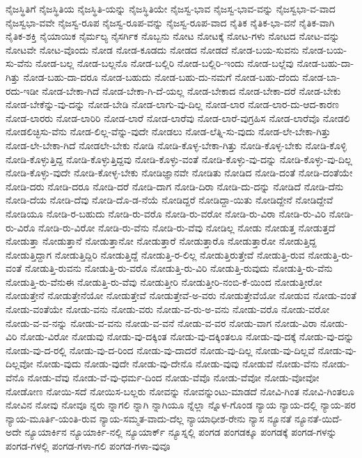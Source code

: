 {ನೈಜಸ್ಥಿತಿಗೆ
ನೈಜಸ್ಥಿತಿಯ
ನೈಜಸ್ಥಿತಿ-ಯನ್ನು
ನೈಜಸ್ಥಿತಿಯೇ
ನೈಜಸ್ವ-ಭಾವ
ನೈಜಸ್ವ-ಭಾವ-ವನ್ನು
ನೈಜಸ್ವಭಾ-ವ-ವಾದ
ನೈಜಸ್ವಭಾ-ವವೇ
ನೈಜಸ್ವ-ರೂಪ
ನೈಜಸ್ವ-ರೂಪ-ವನ್ನು
ನೈಜಸ್ವ-ರೂಪ-ವಾದ
ನೈತಿಕ
ನೈತಿಕ-ಭಾ-ವನೆ
ನೈತಿಕ-ವಾಗಿ
ನೈತಿಕ-ಶಕ್ತಿ
ನೈಯಾಯಿಕ
ನೈರ್ಮಲ್ಯ
ನೈಸರ್ಗಿಕ
ನೊಬ್ಬನು
ನೋಟ
ನೋಟಕ್ಕೆ
ನೋಟ-ಗಳು
ನೋಟದ
ನೋಟ-ವನ್ನು
ನೋಟವೇ
ನೋಟ-ವೊಂದು
ನೋಡ
ನೋಡ-ಕೂಡದು
ನೋಡದ
ನೋಡದೆ
ನೋಡ-ಬಯ-ಸುವನು
ನೋಡ-ಬಯ-ಸು-ವೆನು
ನೋಡ-ಬಲ್ಲ
ನೋಡ-ಬಲ್ಲನೊ
ನೋಡ-ಬಲ್ಲಿರಿ
ನೋಡ-ಬಲ್ಲಿರಿ-ಇಂದು
ನೋಡ-ಬಲ್ಲೆವು
ನೋಡ-ಬಹು-ದಾ-ಗಿತ್ತು
ನೋಡ-ಬಹು-ದಾ-ದರೂ
ನೋಡ-ಬಹುದು
ನೋಡ-ಬಹು-ದು-ನಮಗೆ
ನೋಡ-ಬಹು-ದೆಂದು
ನೋಡ-ಬಾ-ರದು-ಇಡೀ
ನೋಡ-ಬೇಕಾ-ಗಿದೆ
ನೋಡ-ಬೇಕಾ-ಗಿ-ದೆ-ಯಲ್ಲ
ನೋಡ-ಬೇಕಾದ
ನೋಡ-ಬೇಕಾ-ದರೆ
ನೋಡ-ಬೇಕು
ನೋಡ-ಬೇಕೆನ್ನು-ವು-ದನ್ನು
ನೋಡ-ಬೇಡಿ
ನೋಡ-ಲಾಗು-ವು-ದಿಲ್ಲ
ನೋಡ-ಲಾರ
ನೋಡ-ಲಾರ-ದು-ಆದ-ಕಾರಣ
ನೋಡ-ಲಾರರು
ನೋಡ-ಲಾರಿರಿ
ನೋಡ-ಲಾರೆ
ನೋಡ-ಲಾರೆವು
ನೋಡ-ಲಾರೆ-ವುಗ್ರಹಿಸ
ನೋಡ-ಲಾರೆವೊ
ನೋಡಲಿ
ನೋಡಲಿಚ್ಛಿಸು-ವೆನು
ನೋಡ-ಲಿಲ್ಲ-ವೆನ್ನು-ವುದೇ
ನೋಡಲು
ನೋಡ-ಲೆತ್ನಿ-ಸು-ವುದು
ನೋಡ-ಲೇ-ಬೇಕಾ-ಗಿತ್ತು
ನೋಡ-ಲೇ-ಬೇಕಾ-ಗಿದೆ
ನೋಡಲೇ-ಬೇಕು
ನೋಡಿ
ನೋಡಿ-ಕೊಳ್ಳ-ಬೇಕಾ-ಗಿತ್ತು
ನೋಡಿ-ಕೊಳ್ಳ-ಬೇಕು
ನೋಡಿ-ಕೊಳ್ಳಿ
ನೋಡಿ-ಕೊಳ್ಳುತ್ತಿದ್ದ
ನೋಡಿ-ಕೊಳ್ಳುತ್ತಿದ್ದವು
ನೋಡಿ-ಕೊಳ್ಳು-ವಂತೆ
ನೋಡಿ-ಕೊಳ್ಳು-ವು-ದನ್ನು
ನೋಡಿ-ಕೊಳ್ಳು-ವು-ದಿಲ್ಲ
ನೋಡಿ-ಕೊಳ್ಳು-ವುದೇ
ನೋಡಿ-ಕೋಳ್ಳ-ಬೇಕು
ನೋಡಿಜ್ಞಾನವೇ
ನೋಡಿತು
ನೋಡಿದ
ನೋಡಿ-ದಂತೆ
ನೋಡಿ-ದಂತೆಯೇ
ನೋಡಿ-ದರು
ನೋಡಿ-ದರೂ
ನೋಡಿ-ದರೆ
ನೋಡಿ-ದಾಗ
ನೋಡಿ-ದಿರಾ
ನೋಡಿ-ದು-ದನ್ನು
ನೋಡಿದೆ
ನೋಡಿ-ದೆನು
ನೋಡಿ-ದೆಯ
ನೋಡಿ-ದೆವು
ನೋಡಿ-ದೊ-ಡ-ನೆಯೆ
ನೋಡಿದ್ದರೆ
ನೋಡಿದ್ದಾ-ಯಿತು
ನೋಡಿದ್ದೇನೆ
ನೋಡಿದ್ದೇವೆ
ನೋಡಿಯೂ
ನೋಡಿ-ರ-ಬಹುದು
ನೋಡಿ-ರು-ವರೊ
ನೋಡಿ-ರು-ವರೋ
ನೋಡಿ-ರು-ವಿರಾ
ನೋಡಿ-ರು-ವಿರಿ
ನೋಡಿ-ರು-ವಿರೊ
ನೋಡಿ-ರು-ವಿರೋ
ನೋಡಿ-ರು-ವೆನು
ನೋಡಿ-ರು-ವೆವು
ನೋಡಿಲ್ಲ
ನೋಡು
ನೋಡುತ್ತ
ನೋಡುತ್ತದೆ
ನೋಡುತ್ತಾ
ನೋಡುತ್ತಾನೆ
ನೋಡುತ್ತಾನೋ
ನೋಡುತ್ತಾರೆ
ನೋಡುತ್ತಾರೊ
ನೋಡುತ್ತಾರೋ
ನೋಡುತ್ತಿದ್ದ
ನೋಡುತ್ತಿದ್ದಾಗ
ನೋಡುತ್ತಿದ್ದಿರಿ
ನೋಡುತ್ತಿದ್ದೆ
ನೋಡುತ್ತಿ-ರ-ಲಿಲ್ಲ
ನೋಡುತ್ತಿರುತ್ತೇವೆ
ನೋಡುತ್ತಿ-ರುವ
ನೋಡುತ್ತಿ-ರು-ವಂತೆ
ನೋಡುತ್ತಿ-ರುವನು
ನೋಡುತ್ತಿ-ರು-ವರೊ
ನೋಡುತ್ತಿ-ರು-ವಿರಿ
ನೋಡುತ್ತಿ-ರುವುದು
ನೋಡುತ್ತಿ-ರು-ವೆನು
ನೋಡುತ್ತಿ-ರು-ವೆನುಈ
ನೋಡುತ್ತಿ-ರು-ವೆವು
ನೋಡುತ್ತೀರಿ
ನೋಡುತ್ತೀರಿ-ನಂಬಿ-ಕೆ-ಯಿಂದ
ನೋಡುತ್ತೀರೋ
ನೋಡುತ್ತೇನೆ
ನೋಡುತ್ತೇನೆಯೋ
ನೋಡುತ್ತೇವೆ
ನೋಡುತ್ತೇವೆ-ಅ-ವರು
ನೋಡುತ್ತೇವೆಯೋ
ನೋಡುವ
ನೋಡು-ವಂತೆ
ನೋಡು-ವಂತೆಯೇ
ನೋಡು-ವನು
ನೋಡು-ವರು
ನೋಡು-ವ-ರು-ಅ-ವನು
ನೋಡು-ವರೊ
ನೋಡು-ವರೋ
ನೋಡು-ವ-ವ-ನನ್ನು
ನೋಡು-ವ-ವನು
ನೋಡು-ವ-ವನೆ
ನೋಡು-ವ-ವರ
ನೋಡು-ವಾಗ
ನೋಡು-ವಿರಾ
ನೋಡು-ವಿರಿ
ನೋಡು-ವಿರೋ
ನೋಡುವು
ನೋಡು-ವು-ದಕ್ಕಿಂತ
ನೋಡು-ವು-ದಕ್ಕಿಂತಲೂ
ನೋಡು-ವು-ದಕ್ಕೆ
ನೋಡು-ವು-ದನ್ನು
ನೋಡು-ವು-ದ-ರಲ್ಲಿ
ನೋಡು-ವು-ದ-ರಿಂದ
ನೋಡು-ವು-ದಾದರೆ
ನೋಡು-ವು-ದಿಲ್ಲ
ನೋಡು-ವು-ದಿಲ್ಲವೆ
ನೋಡು-ವು-ದಿಲ್ಲವೋ
ನೋಡು-ವುದು
ನೋಡು-ವುದೇ
ನೋಡು-ವು-ದೇನೊ
ನೋಡು-ವುವು
ನೋಡುವೆ
ನೋಡು-ವೆನು
ನೋಡು-ವೆನೊ
ನೋಡು-ವೆವು
ನೋಡು-ವೆ-ವು-ಧರ್ಮ-ದಿಂದ
ನೋಡು-ವೆವೊ
ನೋಡು-ವೆವೋ
ನೋಡು-ವೋವೋ
ನೋಡೋಣ
ನೋಯಿ-ಸದೆ
ನೋಯಿಸ-ಬಲ್ಲರು
ನೋವನ್ನು
ನೋವನ್ನುಂಟು-ಮಾಡದೆ
ನೋವಿ-ಗಿಂತ
ನೋವಿ-ಗಿಂತಲೂ
ನೋವಿನ
ನೋವು
ನೋವೂ
ನ್ನರು
ನ್ನಾಗಲಿ
ನ್ನಾಗಿ
ನ್ನಾಗಿಯೂ
ನ್ನೆಲ್ಲಾ
ನ್ನೊಳ-ಗೊಂಡ
ನ್ಯಾಯ
ನ್ಯಾಯ-ದಲ್ಲಿ
ನ್ಯಾಯ-ಪರ
ನ್ಯಾಯ-ಮೂರ್ತಿ-ಯಂತಿ-ರುವ
ನ್ಯಾಯ-ಸಮ್ಮತ-ವಾದು-ದೆಲ್ಲ
ನ್ಯಾಯಾಧೀಶ-ರೇನು
ನ್ಯಾಸ
ನ್ಯೂನತೆ
ನ್ಯೂನತೆ-ಯಿದೆ-ಅದೇ
ನ್ಯೂಯಾರ್ಕಿನ
ನ್ಯೂಯಾರ್ಕಿ-ನಲ್ಲಿ
ನ್ಯೂಯಾರ್ಕ್
ನ್ಯೂಸ್ನಲ್ಲಿ
ಪಂಗಡ
ಪಂಗಡಕ್ಕೂ
ಪಂಗಡಕ್ಕೆ
ಪಂಗಡ-ಗಳನ್ನು
ಪಂಗಡ-ಗಳಲ್ಲಿ
ಪಂಗಡ-ಗಳಾ-ಗಲಿ
ಪಂಗಡ-ಗಳಾ-ವುವೂ
}
